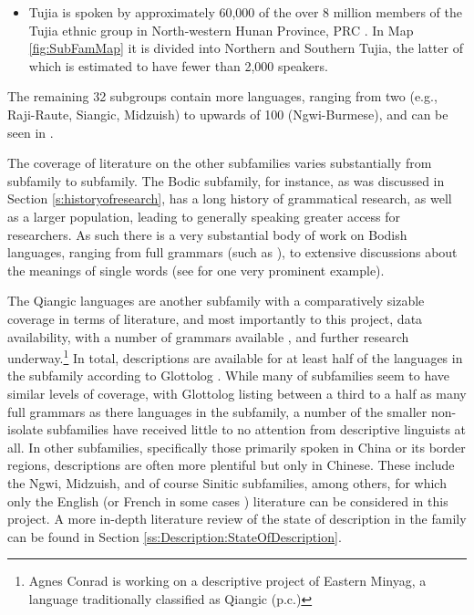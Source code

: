 \begin{itemize}
    \item Tujia is spoken by approximately 60,000 of the over 8 million members of the Tujia ethnic group in North-western Hunan Province, PRC \cite{Brassett2006}. In Map \ref{fig:SubFamMap} it is divided into Northern and Southern Tujia, the latter of which is estimated to have fewer than 2,000 speakers.
\end{itemize}

The remaining 32 subgroups contain more languages, ranging from two (e.g., Raji-Raute, Siangic, Midzuish) to upwards of 100 (Ngwi-Burmese), and can be seen in .

The coverage of literature on the other subfamilies varies substantially from subfamily to subfamily. The Bodic subfamily, for instance, as was discussed in Section \ref{s:historyofresearch}, has a long history of grammatical research, as well as a larger population, leading to generally speaking greater access for researchers. As such there is a very substantial body of work on Bodish languages, ranging from full grammars (such as ), to extensive discussions about the meanings of single words (see  for one very prominent example).

The Qiangic languages are another subfamily with a comparatively sizable coverage in terms of literature, and most importantly to this project, data availability, with a number of grammars available \cites{LaPolla2003}{Ding2014}, and further research underway.\footnote{Agnes Conrad is working on a descriptive project of Eastern Minyag, a language traditionally classified as Qiangic (p.c.)} In total, descriptions are available for at least half of the languages in the subfamily according to Glottolog \cite{glottolog}. While many of subfamilies seem to have similar levels of coverage, with Glottolog listing between a third to a half as many full grammars as there languages in the subfamily, a number of the smaller non-isolate subfamilies have received little to no attention from descriptive linguists at all. In other subfamilies, specifically those primarily spoken in China or its border regions, descriptions are often more plentiful but only in Chinese. These include the Ngwi, Midzuish, and of course Sinitic subfamilies, among others, for which only the English (or French in some cases \cite{Lai2017}) literature can be considered in this project. A more in-depth literature review of the state of description in the family can be found in Section \ref{ss:Description:StateOfDescription}.

